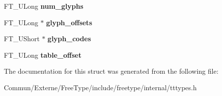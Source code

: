 \begin{DoxyCompactItemize}
\item 
F\+T\+\_\+\+U\+Long {\bfseries num\+\_\+glyphs}\hypertarget{struct_t_t___s_bit___range_rec___afd9437150f8d9f784f98da6d61223464}{}\label{struct_t_t___s_bit___range_rec___afd9437150f8d9f784f98da6d61223464}

\item 
F\+T\+\_\+\+U\+Long $\ast$ {\bfseries glyph\+\_\+offsets}\hypertarget{struct_t_t___s_bit___range_rec___a475f649f101b5886cc2443934e6aa9ca}{}\label{struct_t_t___s_bit___range_rec___a475f649f101b5886cc2443934e6aa9ca}

\item 
F\+T\+\_\+\+U\+Short $\ast$ {\bfseries glyph\+\_\+codes}\hypertarget{struct_t_t___s_bit___range_rec___ad40d4aa7e48bdb4ab8c98850f1bba178}{}\label{struct_t_t___s_bit___range_rec___ad40d4aa7e48bdb4ab8c98850f1bba178}

\item 
F\+T\+\_\+\+U\+Long {\bfseries table\+\_\+offset}\hypertarget{struct_t_t___s_bit___range_rec___a54457937305b5ccf895f5b23c0cc6006}{}\label{struct_t_t___s_bit___range_rec___a54457937305b5ccf895f5b23c0cc6006}

\end{DoxyCompactItemize}


The documentation for this struct was generated from the following file\+:\begin{DoxyCompactItemize}
\item 
Commun/\+Externe/\+Free\+Type/include/freetype/internal/tttypes.\+h\end{DoxyCompactItemize}
